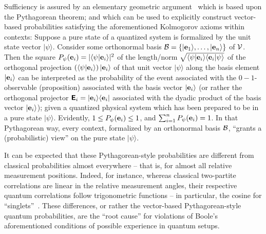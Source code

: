 \documentclass[%
  twocolumn,
 showpacs,
 showkeys,
 preprintnumbers,
 amsmath,amssymb,
 aps,
  pra,
  longbibliography,
 ]{revtex4-1}
\begin{document}
Sufficiency is assured by an elementary geometric argument~\citep{Gleason} which is based upon the Pythagorean theorem;
and which can be used to explicitly construct vector-based probabilities satisfying the aforementioned Kolmogorov axioms within contexts:
Suppose a pure state of a quantized system is formalized
by the unit state vector $\vert \psi \rangle$.
Consider some orthonormal basis ${\cal B} = \{ \vert {\bf e}_1\rangle ,\ldots , \vert {\bf e}_n\rangle \}$ of $\cal V$.
Then the  square
$P_\psi({\bf e}_i)= \vert \langle \psi \vert {\bf e}_i\rangle \vert^2$
of the length/norm
$\sqrt{
\langle \psi \vert {\bf e}_i\rangle
\langle {\bf e}_i \vert \psi\rangle
}$
of the orthogonal projection
$\left(\langle \psi \vert {\bf e}_i\rangle  \right)  \vert {\bf e}_i\rangle$
of that unit vector
$\vert \psi \rangle$
along the basis element
$\vert {\bf e}_i\rangle$
can be interpreted as
the probability of the event associated with the $0-1$-observable (proposition) associated with the basis vector  $\vert {\bf e}_i\rangle$
(or rather the orthogonal projector $\textsf{\textbf{E}}_i =  \vert {\bf e}_i \rangle \langle   {\bf e}_i  \vert $
associated with the dyadic product of the basis vector $\vert {\bf e}_i\rangle$);
given a quantized physical system which has been prepared to be in a pure state
$\vert \psi \rangle $.
Evidently, $1\le P_\psi({\bf e}_i)\le1$,
and $\sum_{i=1}^n P_\psi({\bf e}_i)=1$.
In that Pythagorean way, every context, formalized by an orthonormal basis ${\cal B}$,
``grants a (probabilistic) view'' on the pure state $\vert \psi \rangle$.

It can be expected that these Pythagorean-style probabilities are different from classical probabilities
almost everywhere --
that is, for almost all relative measurement positions.
Indeed, for instance, whereas classical two-partite correlations are
linear in the relative measurement angles, their respective quantum correlations follow trigonometric functions
-- in particular, the cosine for ``singlets''~\citep{peres}.
These differences, or rather the vector-based Pythagorean-style quantum  probabilities, are the ``root cause'' for violations of
Boole's aforementioned conditions of possible experience in quantum setups.
\end{document}
